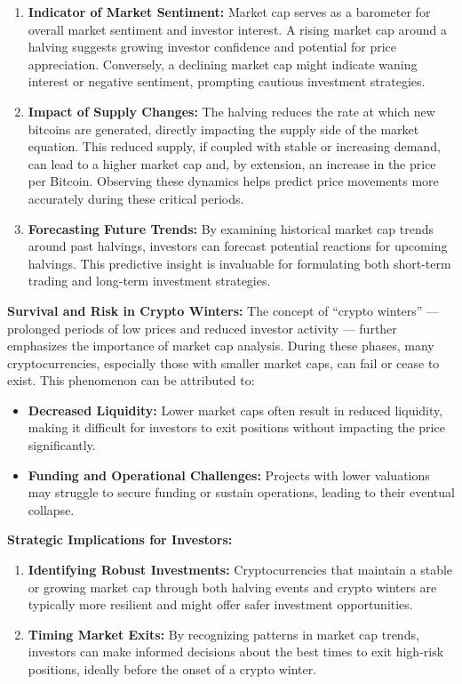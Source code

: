 \documentclass[
]{article}
\begin{document}
\begin{enumerate}
\def\labelenumi{\arabic{enumi}.}
\item
  \textbf{Indicator of Market Sentiment:} Market cap serves as a
  barometer for overall market sentiment and investor interest. A rising
  market cap around a halving suggests growing investor confidence and
  potential for price appreciation. Conversely, a declining market cap
  might indicate waning interest or negative sentiment, prompting
  cautious investment strategies.
\item
  \textbf{Impact of Supply Changes:} The halving reduces the rate at
  which new bitcoins are generated, directly impacting the supply side
  of the market equation. This reduced supply, if coupled with stable or
  increasing demand, can lead to a higher market cap and, by extension,
  an increase in the price per Bitcoin. Observing these dynamics helps
  predict price movements more accurately during these critical periods.
\item
  \textbf{Forecasting Future Trends:} By examining historical market cap
  trends around past halvings, investors can forecast potential
  reactions for upcoming halvings. This predictive insight is invaluable
  for formulating both short-term trading and long-term investment
  strategies.
\end{enumerate}

\textbf{Survival and Risk in Crypto Winters:} The concept of ``crypto
winters'' --- prolonged periods of low prices and reduced investor
activity --- further emphasizes the importance of market cap analysis.
During these phases, many cryptocurrencies, especially those with
smaller market caps, can fail or cease to exist. This phenomenon can be
attributed to:

\begin{itemize}
\item
  \textbf{Decreased Liquidity:} Lower market caps often result in
  reduced liquidity, making it difficult for investors to exit positions
  without impacting the price significantly.
\item
  \textbf{Funding and Operational Challenges:} Projects with lower
  valuations may struggle to secure funding or sustain operations,
  leading to their eventual collapse.
\end{itemize}

\textbf{Strategic Implications for Investors:}

\begin{enumerate}
\def\labelenumi{\arabic{enumi}.}
\item
  \textbf{Identifying Robust Investments:} Cryptocurrencies that
  maintain a stable or growing market cap through both halving events
  and crypto winters are typically more resilient and might offer safer
  investment opportunities.
\item
  \textbf{Timing Market Exits:} By recognizing patterns in market cap
  trends, investors can make informed decisions about the best times to
  exit high-risk positions, ideally before the onset of a crypto winter.
\end{enumerate}
\end{document}
